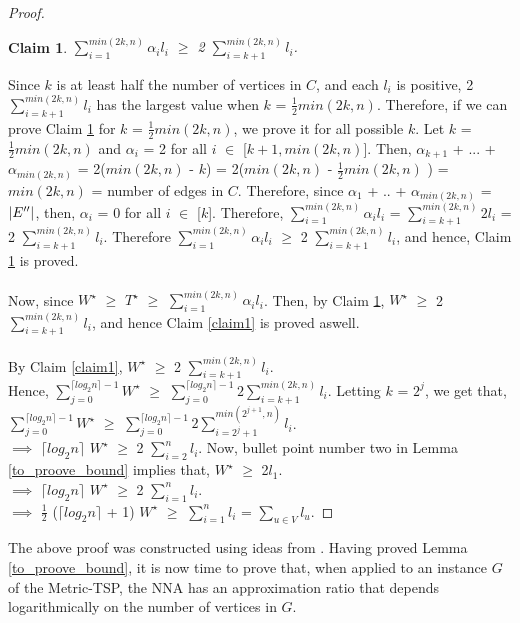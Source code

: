 \documentclass[12pt]{article}
\newtheorem{claim}{Claim}
\numberwithin{equation}{subsection}
\numberwithin{table}{subsection}
\begin{document}
\begin{proof}
\begin{claim}
\label{claim2}
$\sum_{i =1}^{min(2k, n)} \alpha_i l_i$ $\geq$ 2 $\sum_{i = k + 1}^{min(2k, n)} l_i$.
\end{claim}
Since $k$ is at least half the number of vertices in $C$, and each $l_i$ is positive, 2 $\sum_{i = k + 1}^{min(2k, n)} l_i$ has the largest value when $k$ = $\frac{1}{2} min(2k, n)$. Therefore, if we can prove Claim \ref{claim2} for $k$ = $\frac{1}{2} min(2k, n)$, we prove it for all possible $k$. Let $k$ = $\frac{1}{2} min(2k, n)$ and $\alpha_i$ = 2 for all $i$ $\in$ [$k+1,min(2k, n)$]. Then, $\alpha_{k+1}$ + ... + $\alpha_{min(2k, n)}$ = 2($min(2k, n)$ - $k$) = 2($min(2k, n)$ -  $\frac{1}{2} min(2k, n)$ ) =  $min(2k, n)$ = number of edges in $C$. Therefore, since $\alpha_1$ + .. + $\alpha_{min(2k, n)}$ = $\abs{E^{\prime\prime}}$, then, $\alpha_i$ = 0 for all $i$ $\in$ [$k$]. Therefore, $\sum_{i =1}^{min(2k, n)} \alpha_i l_i$ = $\sum_{i = k + 1}^{min(2k, n)}2 l_i$ = 2 $\sum_{i = k + 1}^{min(2k, n)} l_i$. Therefore $\sum_{i =1}^{min(2k, n)} \alpha_i l_i$ $\geq$ 2 $\sum_{i = k + 1}^{min(2k, n)} l_i$, and hence, Claim \ref{claim2} is proved.\\\\
Now, since $W^\star$ $\geq$ $T^\star$ $\geq$ $\sum_{i =1}^{min(2k, n)} \alpha_i l_i$. Then, by Claim \ref{claim2}, $W^\star$  $\geq$ 2 $\sum_{i = k + 1}^{min(2k, n)} l_i$, and hence Claim \ref{claim1} is proved aswell.\\\\
By Claim \ref{claim1},  $W^\star$  $\geq$ 2 $\sum_{i = k + 1}^{min(2k, n)} l_i$. \\Hence,  $\sum_{j = 0}^{\lceil log_2 n \rceil - 1} W^\star$  $\geq$ $\sum_{j = 0}^{\lceil log_2 n \rceil -1} 2 \sum_{i = k + 1}^{min(2k, n)} l_i$. Letting $k$ = $2^{j}$, we get that,  $\sum_{j = 0}^{\lceil log_2 n \rceil - 1} W^\star$  $\geq$ $\sum_{j = 0}^{\lceil log_2 n \rceil -1} 2 \sum_{i = 2^j + 1}^{min(2^{j+1}, n)} l_i$. \\$\implies$ $\lceil log_2 n \rceil$ $W^\star$  $\geq$ 2 $\sum_{i = 2}^{n} l_i$. Now, bullet point number two in Lemma \ref{to_proove_bound} implies that, $W^\star$ $\geq$ 2$l_1$. \\$\implies$ $\lceil log_2 n \rceil$ $W^\star$  $\geq$ 2 $\sum_{i = 1}^{n} l_i$.\\$\implies$  $\frac{1}{2}$ ($\lceil log_2 n \rceil$ + 1) $W^\star$  $\geq$ $\sum_{i = 1}^{n} l_i$ = $\sum_{u \in V} l_u$.
\end{proof}
The above proof was constructed using ideas from \cite{Rosenkrantz}. Having proved Lemma \ref{to_proove_bound}, it is now time to prove that, when applied to an instance $G$ of the Metric-TSP, the NNA has an approximation ratio that depends logarithmically on the number of vertices in $G$.
\end{document}
